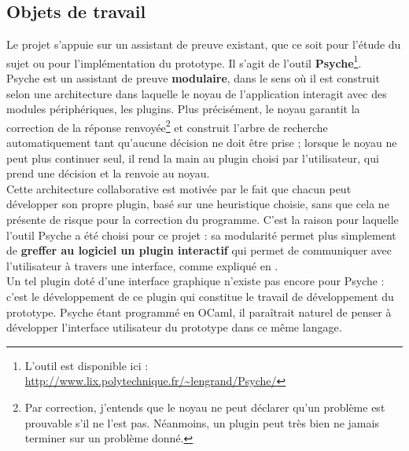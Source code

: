 \subsection{Objets de travail}

Le projet s'appuie sur un assistant de preuve existant, que ce soit pour l'étude du sujet ou pour l'implémentation du prototype. Il s'agit de l'outil \textbf{Psyche}\footnote{L'outil est disponible ici : \url{http://www.lix.polytechnique.fr/~lengrand/Psyche/}}.\\

Psyche est un assistant de preuve \textbf{modulaire}, dans le sens où il est construit selon une architecture dans laquelle le noyau de l'application interagit avec des modules périphériques, les plugins. Plus précisément, le noyau garantit la correction de la réponse renvoyée\footnote{Par correction, j'entends que le noyau ne peut déclarer qu'un problème est prouvable s'il ne l'est pas. Néanmoins, un plugin peut très bien ne jamais terminer sur un problème donné.} et construit l'arbre de recherche automatiquement tant qu'aucune décision ne doit être prise ; lorsque le noyau ne peut plus continuer seul, il rend la main au plugin choisi par l'utilisateur, qui prend une décision et la renvoie au noyau.\\

Cette architecture collaborative est motivée par le fait que chacun peut développer son propre plugin, basé sur une heuristique choisie, sans que cela ne présente de risque pour la correction du programme. C'est la raison pour laquelle l'outil Psyche a été choisi pour ce projet : sa modularité permet plus simplement de \textbf{greffer au logiciel un plugin interactif} qui permet de communiquer avec l'utilisateur à travers une interface, comme expliqué en \cite{graham2013psyche}.\\

Un tel plugin doté d'une interface graphique n'existe pas encore pour Psyche : c'est le développement de ce plugin qui constitue le travail de développement du prototype. Psyche étant programmé en OCaml, il paraîtrait naturel de penser à développer l'interface utilisateur du prototype dans ce même langage.\\

